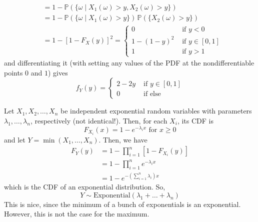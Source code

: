 \documentclass{article}
\begin{document}
\begin{example}[Uniforms]
\begin{align*}
          & = 1 - \mathbb{P}(\{\omega \mid X_1 (\omega) > y, X_2 (\omega) > y \}) \\
          & = 1 - \mathbb{P}(\{\omega \mid X_1 (\omega) > y\}) \, \mathbb{P}(\{ X_2 (\omega) > y \}) \\ 
          & = 1 - [1 - F_X (y)]^2 = \begin{cases} 0 & \text{ if } y < 0 \\
          1 - (1 - y)^2 & \text{ if } y \in [0, 1] \\
          1 & \text{ if } y > 1 \end{cases} 
        \end{align*}
        and differentiating it (with setting any values of the PDF at the nondifferentiable points $0$ and $1$) gives 
        \begin{equation}
          f_Y (y) = \begin{cases} 2 - 2y & \text{ if } y \in [0, 1] \\
          0 & \text{ if else} \end{cases}
        \end{equation}
      \end{example}

      \begin{example}[Exponentials]
        Let $X_1, X_2, \ldots, X_n$ be independent exponential random variables with parameters $\lambda_1, \ldots, \lambda_n$, respectively (not identical!). Then, for each $X_i$, its CDF is 
        \begin{equation}
          F_{X_i} (x) = 1 - e^{-\lambda_i x} \text{ for } x \geq 0
        \end{equation}
        and let $Y = \min(X_1, \ldots, X_n)$. Then, we have 
        \begin{align*}
          F_Y (y) & = 1 - \prod_{i=1}^n [ 1 - F_{X_i} (y)] \\
          & = 1 - \prod_{i=1}^n e^{-\lambda_i x} \\
          & = 1 - e^{- ( \sum_{i=1}^n \lambda_i ) x}
        \end{align*}
        which is the CDF of an exponential distribution. So, 
        \begin{equation}
          Y \sim \mathrm{Exponential}(\lambda_1 + \ldots + \lambda_n)
        \end{equation}
        This is nice, since the minimum of a bunch of exponentials is an exponential. However, this is not the case for the maximum. 
      \end{example}
\end{document}
